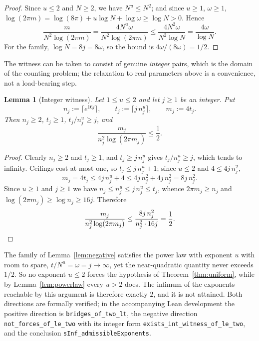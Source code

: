 \documentclass[11pt,reqno]{amsart}
\theoremstyle{plain}
\newtheorem{lemma}[theorem]{Lemma}
\theoremstyle{definition}
\theoremstyle{remark}
\begin{document}
\begin{proof}
Since \(u\le2\) and \(N\ge2\), we have \(N^u\le N^2\); and since \(u\ge1\),
\(\omega\ge1\), \(\log(2\pi m)=\log(8\pi)+u\log N+\log\omega\ge\log N>0\).
Hence
\[
  \frac m{N^2\log(2\pi m)}=\frac{4N^u\omega}{N^2\log(2\pi m)}
  \le\frac{4N^2\omega}{N^2\log N}=\frac{4\omega}{\log N}.
\]
For the family, \(\log N=8j=8\omega\), so the bound is \(4\omega/(8\omega)=1/2\).
\end{proof}

The witness can be taken to consist of genuine \emph{integer} pairs, which is
the domain of the counting problem; the relaxation to real parameters above is
a convenience, not a load-bearing step.

\begin{lemma}[Integer witness]\label{lem:intwitness}
Let \(1\le u\le2\) and let \(j\ge1\) be an integer. Put
\[
  n_j:=\bigl\lceil e^{16j}\bigr\rceil,\qquad
  t_j:=\bigl\lceil j\,n_j^u\bigr\rceil,\qquad m_j:=4t_j .
\]
Then \(n_j\ge2\), \(t_j\ge1\), \(t_j/n_j^u\ge j\), and
\[
  \frac{m_j}{n_j^2\log(2\pi m_j)}\le\frac12 .
\]
\end{lemma}

\begin{proof}
Clearly \(n_j\ge2\) and \(t_j\ge1\), and \(t_j\ge j\,n_j^u\) gives
\(t_j/n_j^u\ge j\), which tends to infinity. Ceilings cost at most one, so
\(t_j\le j\,n_j^u+1\); since \(u\le2\) and \(4\le4j\,n_j^2\),
\[
  m_j=4t_j\le4j\,n_j^u+4\le4j\,n_j^2+4j\,n_j^2=8j\,n_j^2 .
\]
Since \(u\ge1\) and \(j\ge1\) we have \(n_j\le n_j^u\le j\,n_j^u\le t_j\),
whence \(2\pi m_j\ge n_j\) and \(\log(2\pi m_j)\ge\log n_j\ge16j\). Therefore
\[
  \frac{m_j}{n_j^2\log(2\pi m_j)}\le\frac{8j\,n_j^2}{n_j^2\cdot16j}=\frac12 .
  \qedhere
\]
\end{proof}

The family of Lemma~\ref{lem:negative} satisfies the power law with exponent
\(u\) with room to spare, \(t/N^u=\omega=j\to\infty\), yet the
near-quadratic quantity never exceeds \(1/2\). So no exponent \(u\le2\) forces
the hypothesis of Theorem~\ref{thm:uniform}, while by
Lemma~\ref{lem:powerlaw} every \(u>2\) does. The infimum of the exponents
reachable by this argument is therefore exactly \(2\), and it is not attained.
Both directions are formally verified; in the accompanying Lean development the
positive direction is \texttt{bridges\_of\_two\_lt}, the negative direction
\texttt{not\_forces\_of\_le\_two} with its integer form
\texttt{exists\_int\_witness\_of\_le\_two}, and the conclusion
\texttt{sInf\_admissibleExponents}.
\end{document}
